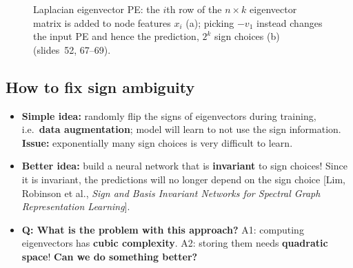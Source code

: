 \begin{figure}[htbp]
  \centering
  \caption{Laplacian eigenvector PE: the $i$th row of the $n\times k$ eigenvector
  matrix is added to node features $x_i$ (a); picking $-v_1$ instead changes the
  input PE and hence the prediction, $2^k$ sign choices (b) (slides~52, 67--69).}
  \label{fig:lec08-sign}
\end{figure}

\subsection{How to fix sign ambiguity}\label{sec:lec08-fix}

\begin{itemize}
  \item \textbf{Simple idea:} randomly flip the signs of eigenvectors during
    training, i.e.\ \textbf{data augmentation}; model will learn to not use the
    sign information. \textbf{Issue:} exponentially many sign choices is very
    difficult to learn.
  \item \textbf{Better idea:} build a neural network that is \textbf{invariant}
    to sign choices! Since it is invariant, the predictions will no longer
    depend on the sign choice [Lim, Robinson et al., \emph{Sign and Basis
    Invariant Networks for Spectral Graph Representation Learning}].
  \item \textbf{Q: What is the problem with this approach?} A1: computing
    eigenvectors has \textbf{cubic complexity}. A2: storing them needs
    \textbf{quadratic space}! \textbf{Can we do something better?}
\end{itemize}

